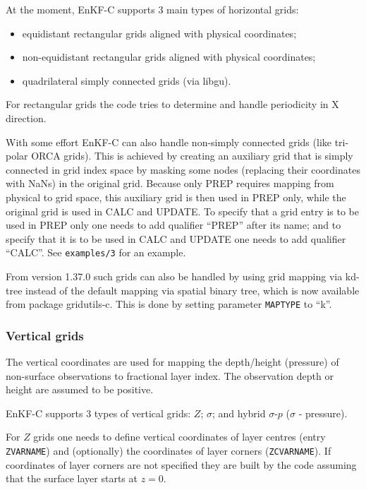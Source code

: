 \documentclass[11pt]{report}
\begin{document}
At the moment, EnKF-C supports 3 main types of horizontal grids:
\begin{itemize}
\item equidistant rectangular grids aligned with physical coordinates;
\item non-equidistant rectangular grids aligned with physical coordinates;
\item quadrilateral simply connected grids (via libgu).
\end{itemize}
For rectangular grids the code tries to determine and handle periodicity in X direction.

With some effort EnKF-C can also handle non-simply connected grids (like tri-polar ORCA grids).
This is achieved by creating an auxiliary grid that is simply connected in grid index space by masking some nodes (replacing their coordinates with NaNs) in the original grid.
Because only PREP requires mapping from physical to grid space, this auxiliary grid is then used in PREP only, while the original grid is used in CALC and UPDATE.
To specify that a grid entry is to be used in PREP only one needs to add qualifier ``PREP'' after its name; and to specify that it is to be used in CALC and UPDATE one needs to add qualifier ``CALC''.
See \verb|examples/3| for an example.

From version 1.37.0 such grids can also be handled by using grid mapping via kd-tree instead of the default mapping via spatial binary tree, which is now available from package gridutils-c.
This is done by setting parameter \verb|MAPTYPE| to ``k''.

\subsubsection{Vertical grids}

The vertical coordinates are used for mapping the depth/height (pressure) of non-surface observations to fractional layer index.
The observation depth or height are assumed to be positive.

EnKF-C supports 3 types of vertical grids: $Z$; $\sigma$; and hybrid $\sigma$-$p$ ($\sigma$ - pressure).

For $Z$ grids one needs to define vertical coordinates of layer centres (entry \verb|ZVARNAME|) and (optionally) the coordinates of layer corners (\verb|ZCVARNAME|).
If coordinates of layer corners are not specified they are built by the code assuming that the surface layer starts at $z = 0$.
\end{document}
